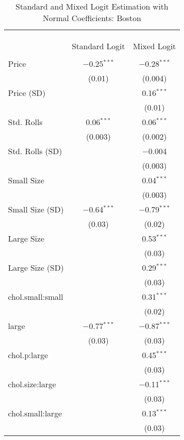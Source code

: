
\begin{table}[!htbp] \centering 
  \caption{Standard and Mixed Logit Estimation with Normal Coefficients: Boston} 
  \label{tab:mnlBostonBaseline} 
\begin{tabular}{@{\extracolsep{5pt}}lcc} 
\\[-1.8ex]\hline 
\hline \\[-1.8ex] 
\\[-1.8ex] & \multicolumn{2}{c}{} \\ 
 & Standard Logit & Mixed Logit \\ 
\hline \\[-1.8ex] 
 Price & $-$0.25$^{***}$ & $-$0.28$^{***}$ \\ 
  & (0.01) & (0.004) \\ 
  Price (SD) &  & 0.16$^{***}$ \\ 
  &  & (0.01) \\ 
  Std. Rolls & 0.06$^{***}$ & 0.06$^{***}$ \\ 
  & (0.003) & (0.002) \\ 
  Std. Rolls (SD) &  & $-$0.004 \\ 
  &  & (0.003) \\ 
  Small Size &  & 0.04$^{***}$ \\ 
  &  & (0.003) \\ 
  Small Size (SD) & $-$0.64$^{***}$ & $-$0.79$^{***}$ \\ 
  & (0.03) & (0.02) \\ 
  Large Size &  & 0.53$^{***}$ \\ 
  &  & (0.03) \\ 
  Large Size (SD) &  & 0.29$^{***}$ \\ 
  &  & (0.03) \\ 
  chol.small:small &  & 0.31$^{***}$ \\ 
  &  & (0.02) \\ 
  large & $-$0.77$^{***}$ & $-$0.87$^{***}$ \\ 
  & (0.03) & (0.03) \\ 
  chol.p:large &  & 0.45$^{***}$ \\ 
  &  & (0.03) \\ 
  chol.size:large &  & $-$0.11$^{***}$ \\ 
  &  & (0.03) \\ 
  chol.small:large &  & 0.13$^{***}$ \\ 
  &  & (0.03) \\ 

\end{tabular}
\end{table}
